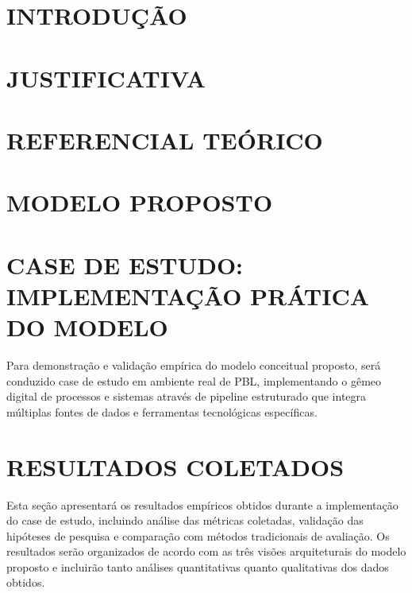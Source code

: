 \documentclass[12pt,a4paper]{article}
\begin{document}
\section{INTRODUÇÃO}


\section{JUSTIFICATIVA}


\section{REFERENCIAL TEÓRICO}


\section{MODELO PROPOSTO}


\section{CASE DE ESTUDO: IMPLEMENTAÇÃO PRÁTICA DO MODELO}

Para demonstração e validação empírica do modelo conceitual proposto, será conduzido case de estudo em ambiente real de PBL, implementando o gêmeo digital de processos e sistemas através de pipeline estruturado que integra múltiplas fontes de dados e ferramentas tecnológicas específicas.


\section{RESULTADOS COLETADOS}

Esta seção apresentará os resultados empíricos obtidos durante a implementação do case de estudo, incluindo análise das métricas coletadas, validação das hipóteses de pesquisa e comparação com métodos tradicionais de avaliação. Os resultados serão organizados de acordo com as três visões arquiteturais do modelo proposto e incluirão tanto análises quantitativas quanto qualitativas dos dados obtidos.
\end{document}
